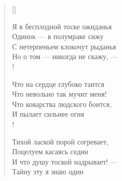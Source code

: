 \newpage
\vspace*{0cm}

\settowidth{\versewidth}{Я в бесплодной тоске ожиданья}
\begin{verse}[\versewidth]
\begin{altverse}
Я в бесплодной тоске ожиданья\\
     Одинок --- в полумраке сижу\ldotst\\
С нетерпеньем клокочут рыданья\ldotst\\
     Но о том --- никогда не скажу, ---\\!

Что на сердце глубоко таится\ldotst\\
     Что невольно так мучит меня!\\
Что коварства людского боится,\\
     И пылает сильнее огня\ldotst\\!

Тихой лаской порой согревает,\\
     Поцелуем касаясь седин\ldotst\\
И что душу тоской надрывает! ---\\
	 Тайну эту я знаю один\ldotst
\end{altverse}
\end{verse}

\newpage
\vspace*{0cm}


